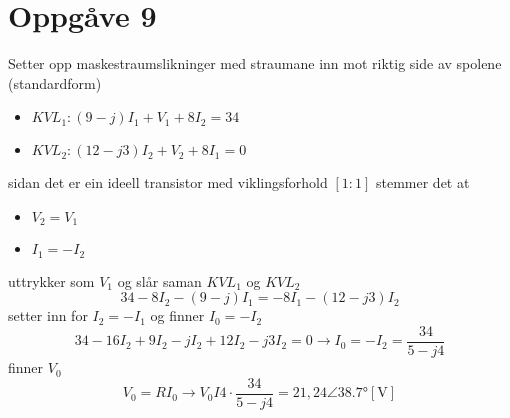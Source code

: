 \documentclass[12pt,a4paper]{article}
\begin{document}
  \section*{Oppgåve 9}
    Setter opp maskestraumslikninger med straumane inn mot riktig side av spolene
    (standardform)
    \begin{itemize}
      \item $KVL_1: (9-j)I_1 + V_1 + 8I_2 = 34$
      \item $KVL_2: (12-j3)I_2 + V_2 + 8I_1 = 0$
    \end{itemize}
    sidan det er ein ideell transistor med viklingsforhold $[1:1]$ stemmer det at 
    \begin{itemize}
      \item $V_2 = V_1$
      \item $I_1 = -I_2$
    \end{itemize}
    uttrykker som $V_1$ og slår saman $KVL_1$ og $KVL_2$
    \begin{equation}
      34 -8I_2 - (9-j)I_1 = -8I_1 - (12-j3)I_2
    \end{equation}
    setter inn for $I_2 = -I_1$ og finner $I_0 = -I_2$
    \begin{equation}
      34-16I_2 + 9I_2 - jI_2 +12I_2 - j3I_2 = 0 \rightarrow I_0 = -I_2 = \frac{34}{5-j4}
    \end{equation}
    finner $V_0$
    \begin{equation}
      V_0 = RI_0 \rightarrow V_0 I 4\cdot\frac{34}{5-j4} = 21,24\angle\ang{38,7}[\si{\volt}]
    \end{equation}
\end{document}
